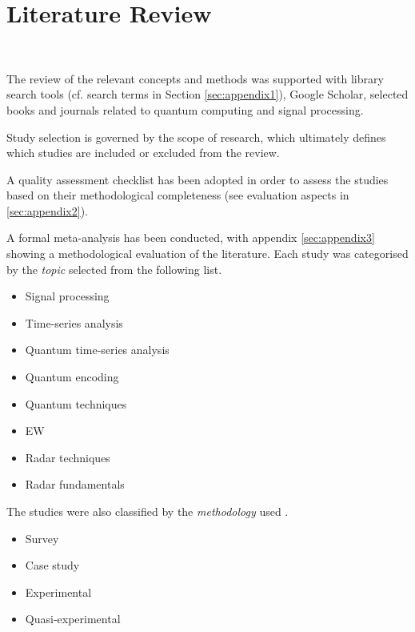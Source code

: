 \section{Literature Review}~\label{sec:literature}


The review of the relevant concepts and methods was supported with library search tools (cf. search terms in Section \ref{sec:appendix1}), Google Scholar, selected books and journals related to quantum computing and signal processing. 

Study selection is governed by the scope of research, which ultimately defines which studies are included or excluded from the review.

A quality assessment checklist \cite{kitchenham_can_2010} has been adopted in order to assess the studies based on their methodological completeness (see evaluation aspects in \ref{sec:appendix2}). 

A formal meta-analysis has been conducted, with appendix \ref{sec:appendix3} showing a methodological evaluation of the literature.
Each study was categorised by the \emph{topic} selected from the following list.
\begin{itemize}
    \item Signal processing
    \item Time-series analysis
    \item Quantum time-series analysis
    \item Quantum encoding
    \item Quantum techniques
    \item \ac{EW}
    \item Radar techniques
    \item Radar fundamentals
\end{itemize}

The studies were also classified by the \emph{methodology} used \cite{wohlin_empirical_2012}.
\begin{itemize}
    \item Survey
    \item Case study
    \item Experimental
    \item Quasi-experimental
\end{itemize}

